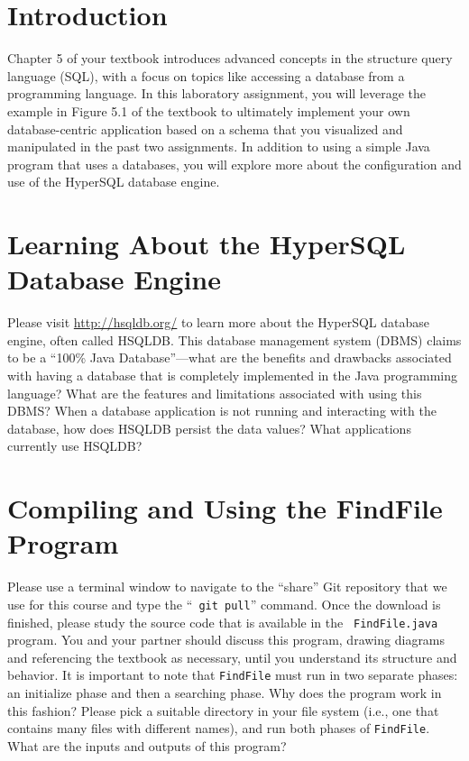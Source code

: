 


\usepackage[compact]{titlesec}



\section*{Introduction}

Chapter 5 of your textbook introduces advanced concepts in the structure query language (SQL), with a focus on topics
like accessing a database from a programming language. In this laboratory assignment, you will leverage the example in
Figure 5.1 of the textbook to ultimately implement your own database-centric application based on a schema that you
visualized and manipulated in the past two assignments. In addition to using a simple Java program that uses a
databases, you will explore more about the configuration and use of the HyperSQL database engine.

\vspace*{-.05in}
\section*{Learning About the HyperSQL Database Engine}

Please visit \url{http://hsqldb.org/} to learn more about the HyperSQL database engine, often called HSQLDB. This
database management system (DBMS) claims to be a ``100\% Java Database''---what are the benefits and drawbacks associated with
having a database that is completely implemented in the Java programming language? What are the features and
limitations associated with using this DBMS? When a database application is not running and interacting with the
database, how does HSQLDB persist the data values? What applications currently use HSQLDB?

\vspace*{-.05in}
\section*{Compiling and Using the FindFile Program}

Please use a terminal window to navigate to the ``share'' Git repository that we use for this course and type the ``{\tt
  git pull}'' command. Once the download is finished, please study the source code that is available in the {\tt
  FindFile.java} program.  You and your partner should discuss this program, drawing diagrams and referencing the
textbook as necessary, until you understand its structure and behavior. It is important to note that {\tt FindFile} must
run in two separate phases: an initialize phase and then a searching phase. Why does the program work in this fashion?
Please pick a suitable directory in your file system (i.e., one that contains many files with different names), and run
both phases of {\tt FindFile}. What are the inputs and outputs of this program?

